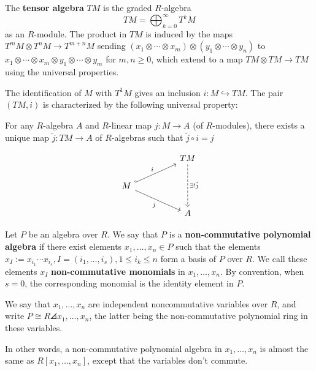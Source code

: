 \begin{defn}
    The \textbf{tensor algebra} $TM$ is the graded $R$-algebra
    $$ TM = \bigoplus_{k=0}^\infty T^kM$$
    as an $R$-module. The product in $TM$ is induced by the maps $T^m M \otimes T^nM \to T^{m+n}M$ sending $(x_1\otimes \cdots \otimes x_m) \otimes (y_1\otimes \cdots \otimes y_n)$ to $x_1\otimes \cdots \otimes x_m \otimes y_1 \otimes \cdots \otimes y_m$ for $m,n \geq 0$, which extend to a map $TM \otimes TM \to TM$ using the universal properties.

    The identification of $M$ with $T^1M$ gives an inclusion $i : M \hookrightarrow TM$. The pair $(TM,i)$ is characterized by the following universal property:

    For any $R$-algebra $A$ and $R$-linear map $j:M \to A$ (of $R$-modules), there exists a unique map $\tilde j : TM \to A$ of $R$-algebras such that $\tilde j \circ i = j$
\end{defn}
\[\begin{tikzcd}
	&& TM \\
	M \\
	&& A
	\arrow["{\exists ! \tilde j}", dashed, from=1-3, to=3-3]
	\arrow["i", hook, from=2-1, to=1-3]
	\arrow["j"', from=2-1, to=3-3]
\end{tikzcd}\]

\begin{defn}
    Let $P$ be an algebra over $R$. We say that $P$ is a \textbf{non-commutative polynomial algebra} if there exist elements $x_1,\dots,x_n \in P$ such that the elements $x_I:= x_{i_1}\cdots x_{i_s},I = (i_1,\dots,i_s), 1 \leq i_k \leq n$ form a basis of $P$ over $R$. We call these elements $x_I$ \textbf{non-commutative monomials} in $x_1,\dots,x_n$. By convention, when $s=0$, the corresponding monomial is the identity element in $P$.

    We say that $x_1,\dots,x_n$ are independent noncommutative variables over $R$, and write $P \cong R\angles {x_1,\dots,x_n}$, the latter being the non-commutative polynomial ring in these variables.

    In other words, a non-commutative polynomial algebra in $x_1,\dots,x_n$ is almost the same as $R[x_1,\dots,x_n]$, except that the variables don't commute.
\end{defn}

